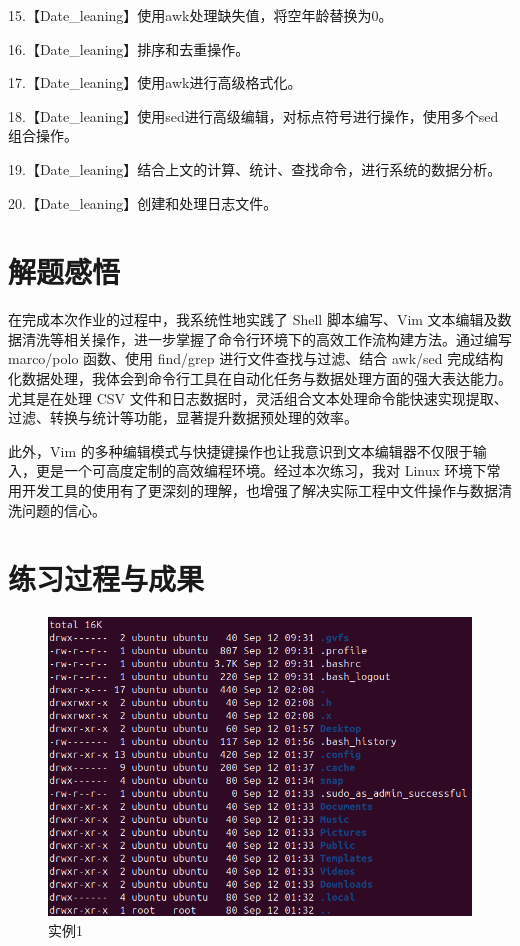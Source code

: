\documentclass[cn,12pt]{report}
\begin{document}
  15.【Date\_leaning】使用awk处理缺失值，将空年龄替换为0。

  16.【Date\_leaning】排序和去重操作。

  17.【Date\_leaning】使用awk进行高级格式化。

  18.【Date\_leaning】使用sed进行高级编辑，对标点符号进行操作，使用多个sed组合操作。

  19.【Date\_leaning】结合上文的计算、统计、查找命令，进行系统的数据分析。

  20.【Date\_leaning】创建和处理日志文件。
\section{解题感悟}
  在完成本次作业的过程中，我系统性地实践了 Shell 脚本编写、Vim 文本编辑及数据清洗等相关操作，进一步掌握了命令行环境下的高效工作流构建方法。通过编写 marco/polo 函数、使用 find/grep 进行文件查找与过滤、结合 awk/sed 完成结构化数据处理，我体会到命令行工具在自动化任务与数据处理方面的强大表达能力。尤其是在处理 CSV 文件和日志数据时，灵活组合文本处理命令能快速实现提取、过滤、转换与统计等功能，显著提升数据预处理的效率。

此外，Vim 的多种编辑模式与快捷键操作也让我意识到文本编辑器不仅限于输入，更是一个可高度定制的高效编程环境。经过本次练习，我对 Linux 环境下常用开发工具的使用有了更深刻的理解，也增强了解决实际工程中文件操作与数据清洗问题的信心。

\section{练习过程与成果}
  \begin{figure}[htbp]
    \centering
    \includegraphics[width=1\textwidth]{image/1.png}
    \caption{实例1}
  \end{figure}
\end{document}
